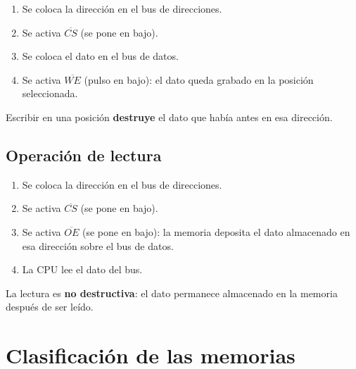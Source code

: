 \begin{enumerate}
  \item Se coloca la dirección en el bus de direcciones.
  \item Se activa $\overline{CS}$ (se pone en bajo).
  \item Se coloca el dato en el bus de datos.
  \item Se activa $\overline{WE}$ (pulso en bajo): el dato queda grabado en la posición seleccionada.
\end{enumerate}


\begin{advertenciabox}
Escribir en una posición \textbf{destruye} el dato que había antes en esa dirección.
\end{advertenciabox}

\subsection{Operación de lectura}

\begin{enumerate}
  \item Se coloca la dirección en el bus de direcciones.
  \item Se activa $\overline{CS}$ (se pone en bajo).
  \item Se activa $\overline{OE}$ (se pone en bajo): la memoria deposita el dato almacenado en esa dirección sobre el bus de datos.
  \item La CPU lee el dato del bus.
\end{enumerate}


\begin{notabox}
La lectura es \textbf{no destructiva}: el dato permanece almacenado en la memoria después de ser leído.
\end{notabox}

\section{Clasificación de las memorias}


